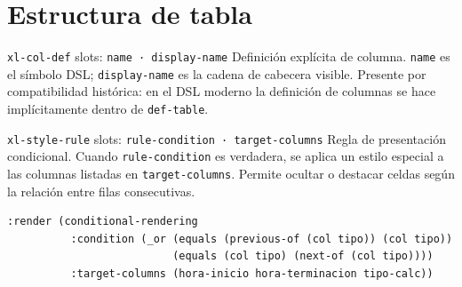 \documentclass[12pt,a4paper]{report}
\begin{document}
\section{Estructura de tabla}

\begin{nodobox}{\texttt{xl-col-def} \quad \small\textmd{slots:} \texttt{name · display-name}}
Definición explícita de columna. \texttt{name} es el símbolo DSL; \texttt{display-name} es la cadena de cabecera visible. Presente por compatibilidad histórica: en el DSL moderno la definición de columnas se hace implícitamente dentro de \texttt{def-table}.
\end{nodobox}

\vspace{0.5em}

\begin{nodobox}{\texttt{xl-style-rule} \quad \small\textmd{slots:} \texttt{rule-condition · target-columns}}
Regla de presentación condicional. Cuando \texttt{rule-condition} es verdadera, se aplica un estilo especial a las columnas listadas en \texttt{target-columns}. Permite ocultar o destacar celdas según la relación entre filas consecutivas.

\begin{lstlisting}
:render (conditional-rendering
          :condition (_or (equals (previous-of (col tipo)) (col tipo))
                          (equals (col tipo) (next-of (col tipo))))
          :target-columns (hora-inicio hora-terminacion tipo-calc))
\end{lstlisting}
\end{nodobox}

\vspace{0.5em}
\end{document}
